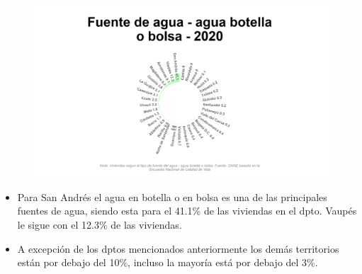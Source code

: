     \begin{figure}[H]
        \caption[Agua en botella o bolsa como fuentes de agua por departamentos para 2020 ]{\label{agua_botella_dptos} }
        \begin{center}
        \includegraphics[width=\textwidth,keepaspectratio]{img/var_143_static.png}
        \end{center}
    \end{figure}
            \begin{itemize}
                    \item Para San Andrés el agua en botella o en bolsa es una de las principales fuentes de agua, siendo esta para el 41.1\% de las viviendas en el dpto. Vaupés le sigue con el 12.3\% de las viviendas.
                    \item A excepción de los dptos mencionados anteriormente los demás territorios están por debajo del 10\%, incluso la mayoría está por debajo del 3\%.
                    \end{itemize}

